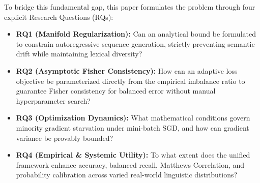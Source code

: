 \documentclass[final,5p,times,twocolumn]{elsarticle}
\begin{document}
To bridge this fundamental gap, this paper formulates the problem through four explicit Research Questions (RQs):
\begin{itemize}
    \item \textbf{RQ1 (Manifold Regularization):} Can an analytical bound be formulated to constrain autoregressive sequence generation, strictly preventing semantic drift while maintaining lexical diversity?
    \item \textbf{RQ2 (Asymptotic Fisher Consistency):} How can an adaptive loss objective be parameterized directly from the empirical imbalance ratio to guarantee Fisher consistency for balanced error without manual hyperparameter search?
    \item \textbf{RQ3 (Optimization Dynamics):} What mathematical conditions govern minority gradient starvation under mini-batch SGD, and how can gradient variance be provably bounded?
    \item \textbf{RQ4 (Empirical \& Systemic Utility):} To what extent does the unified framework enhance accuracy, balanced recall, Matthews Correlation, and probability calibration across varied real-world linguistic distributions?
\end{itemize}
\end{document}
